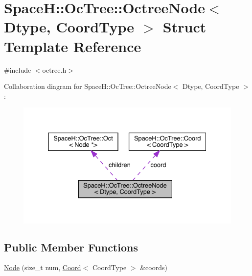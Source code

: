 \hypertarget{struct_space_h_1_1_oc_tree_1_1_octree_node}{}\section{SpaceH\+:\+:Oc\+Tree\+:\+:Octree\+Node$<$ Dtype, Coord\+Type $>$ Struct Template Reference}
\label{struct_space_h_1_1_oc_tree_1_1_octree_node}


{\ttfamily \#include $<$octree.\+h$>$}



Collaboration diagram for SpaceH\+:\+:Oc\+Tree\+:\+:Octree\+Node$<$ Dtype, Coord\+Type $>$\+:
\nopagebreak
\begin{figure}[H]
\begin{center}
\leavevmode
\includegraphics[width=332pt]{struct_space_h_1_1_oc_tree_1_1_octree_node__coll__graph}
\end{center}
\end{figure}
\subsection*{Public Member Functions}
\begin{DoxyCompactItemize}
\item 
\mbox{\hyperlink{struct_space_h_1_1_oc_tree_1_1_octree_node_ad705e740d831361cd8f99ea9bb96742a}{Node}} (size\+\_\+t num, \mbox{\hyperlink{struct_space_h_1_1_oc_tree_1_1_coord}{Coord}}$<$ Coord\+Type $>$ \&coords)
\end{DoxyCompactItemize}
